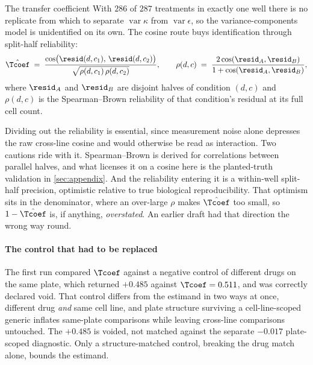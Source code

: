 \begin{defn}{The transfer coefficient}
With $\num{286}$ of $\num{287}$ treatments in exactly one well there is
no replicate from which to separate $\operatorname{var}\kappa$ from
$\operatorname{var}\epsilon$, so the variance-components model is unidentified on
its own. The cosine route buys identification through split-half reliability:
\begin{equation}
 \hat{\Tcoef} \;=\; \frac{\cos\!\big(\resid(d,c_1),\, \resid(d,c_2)\big)}
 {\sqrt{\rho(d,c_1)\,\rho(d,c_2)}},
 \qquad
 \rho(d,c) \;=\; \frac{2\cos(\resid_A, \resid_B)}{1 + \cos(\resid_A, \resid_B)},
\end{equation}
where $\resid_A$ and $\resid_B$ are disjoint halves of condition $(d,c)$ and
$\rho(d,c)$ is the Spearman--Brown reliability of that condition's residual at
its full cell count.
\end{defn}

Dividing out the reliability is essential, since measurement noise alone
depresses the raw cross-line cosine and would otherwise be read as interaction.
Two cautions ride with it. Spearman--Brown is derived for correlations between
parallel halves, and what licenses it on a cosine here is the planted-truth
validation in \cref{sec:appendix}. And the reliability entering it is a
within-well split-half precision, optimistic relative to true biological
reproducibility. That optimism sits in the denominator, where an over-large
$\rho$ makes $\hat{\Tcoef}$ too small, so $1 - \hat{\Tcoef}$ is, if anything,
\emph{overstated}. An earlier draft had that direction the wrong way round.

\paragraph{The control that had to be replaced} The first run compared $\Tcoef$
against a negative control of different drugs on the same plate, which returned
$+0.485$ against $\Tcoef = 0.511$, and was correctly declared
void. That control differs from the estimand in
two ways at once, different drug \emph{and} same cell line, and plate structure
surviving a cell-line-scoped generic inflates same-plate comparisons while
leaving cross-line comparisons untouched. The $+0.485$ is voided, not matched
against the separate $-0.017$ plate-scoped diagnostic. Only a structure-matched
control, breaking the drug match alone, bounds the estimand.


